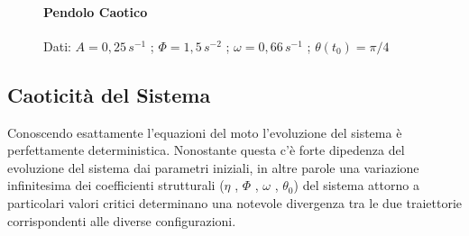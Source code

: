 \documentclass[11pt]{article}
\begin{document}
\begin{figure}[!h]
\caption{}
\paragraph{Pendolo Caotico}

Dati: $A = 0,25 \, s^{-1}$ ; $\Phi = 1,5 \, s^{-2} $ ; $\omega = 0,66 \, s^{-1}$ ; $\theta(t_{0}) = \pi /4$ 
\centering
{}\,
\end{figure}

\clearpage
\subsection{Caoticità del Sistema}
Conoscendo esattamente l'equazioni del moto l'evoluzione del sistema è perfettamente deterministica. Nonostante questa c'è forte dipedenza del evoluzione del sistema dai parametri iniziali, in altre parole una variazione infinitesima dei coefficienti strutturali ($\eta$ , $\Phi$ , $\omega$ , $\theta_{0}$) del sistema attorno a particolari valori critici determinano una notevole divergenza tra le due traiettorie corrispondenti alle diverse configurazioni.
\end{document}
